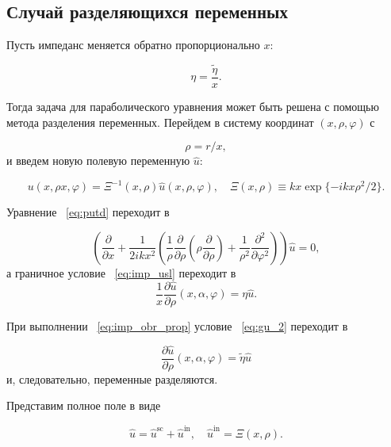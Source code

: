 \subsection{Случай разделяющихся переменных}

Пусть импеданс меняется обратно пропорционально $x$:

\begin{equation}
\label{eq:imp_obr_prop}
\eta = \frac{\tilde{\eta}}{x}.
\end{equation}

Тогда задача для параболического уравнения может быть решена с помощью метода разделения переменных. Перейдем в систему координат $(x, \rho, \varphi)$ с

\begin{equation}
\rho = r/x,
\end{equation}
и введем новую полевую переменную $\hat{u}$:

\begin{equation}
u(x, \rho x, \varphi) = \Xi^{-1} (x, \rho) \hat{u}(x, \rho, \varphi), \quad \Xi(x, \rho) \equiv kx \exp \{ -ikx\rho^2/2 \}.
\end{equation}

Уравнение ~\eqref{eq:putd} переходит в

\begin{equation}
\label{eq:putd_perehodit_v}
\left( \frac{\partial }{\partial x} + \frac{1}{2ikx^2} \left( \frac{1}{\rho} \frac{\partial }{\partial \rho} \left( \rho \frac{\partial}{\partial \rho} \right)  + \frac{1}{\rho^2} \frac{\partial^2}{\partial \varphi^2} \right) \right) \hat{u} = 0,
\end{equation}
а граничное условие ~\eqref{eq:imp_usl} переходит в
\begin{equation}
\label{eq:gu_2}
\frac{1}{x} \frac{\partial \hat{u}}{\partial \rho} (x, \alpha, \varphi) = \eta \hat{u}.
\end{equation}

При выполнении ~\eqref{eq:imp_obr_prop} условие ~\eqref{eq:gu_2} переходит в 

\begin{equation}
\frac{\partial \hat{u}}{\partial \rho} (x, \alpha, \varphi) = \tilde{\eta} \hat{u}
\end{equation}
и, следовательно, переменные разделяются.

Представим полное поле в виде 

$$\hat{u} = \hat{u}^{\text{sc}} + \hat{u}^{\text{in}}, \quad \hat{u}^{\text{in}} = \Xi(x, \rho).$$


